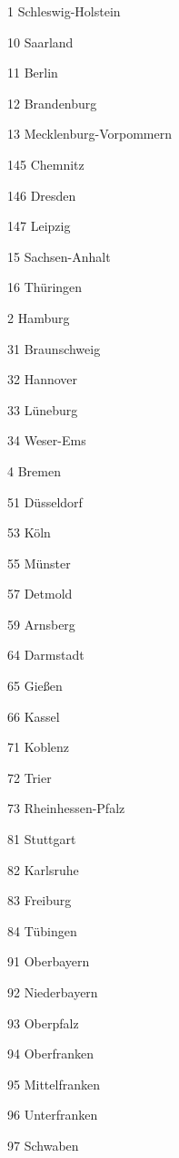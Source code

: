 1  Schleswig-Holstein

10  Saarland

11  Berlin

12  Brandenburg

13  Mecklenburg-Vorpommern

145  Chemnitz

146  Dresden

147  Leipzig

15  Sachsen-Anhalt

16  Thüringen

2  Hamburg

31  Braunschweig

32  Hannover

33  Lüneburg

34  Weser-Ems

4  Bremen

51  Düsseldorf

53  Köln

55  Münster

57  Detmold

59  Arnsberg

64  Darmstadt

65  Gießen

66  Kassel

71  Koblenz

72  Trier

73  Rheinhessen-Pfalz

81  Stuttgart

82  Karlsruhe

83  Freiburg

84  Tübingen

91  Oberbayern

92  Niederbayern

93  Oberpfalz

94  Oberfranken

95  Mittelfranken

96  Unterfranken

97  Schwaben

